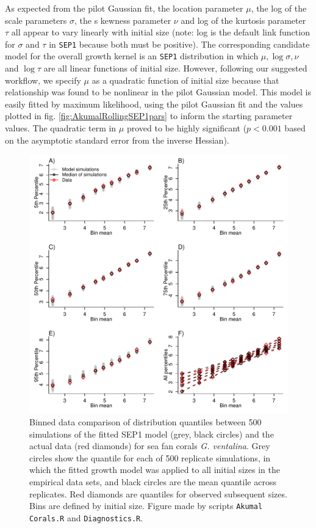 \documentclass[11pt]{article}
\begin{document}
{As expected from the pilot Gaussian fit, the location parameter $\mu$, the log of the scale parameters $\sigma$, the s
kewness parameter $\nu$ and log of the kurtosis parameter $\tau$ all appear to vary linearly with initial size 
(note: log is the default link function for $\sigma$ and $\tau$ in \texttt{SEP1} because both must be positive).
The corresponding candidate model for the overall growth kernel is an \texttt{SEP1} distribution in 
which $\mu, \log \sigma, \nu$ and $\log \tau$ are all linear functions of initial size.
However, following our suggested workflow, we specify $\mu$ as a quadratic function of initial size because that relationship
was found to be nonlinear in the pilot Gaussian model. This model is easily fitted by maximum likelihood, 
using the pilot Gaussian fit and the values plotted in fig. \ref{fig:AkumalRollingSEP1pars} to 
inform the starting parameter values. The quadratic term in $\mu$ proved to be highly significant
($p<0.001$ based on the asymptotic standard error from the inverse Hessian). 

\begin{figure}[tbp]
\centering
\includegraphics[width=.95\textwidth]{figures/CoralQuantileComparePlot.pdf}
\caption{Binned data comparison of distribution quantiles between 500 simulations of the fitted SEP1 model (grey, black circles) and the 
actual data (red diamonds) for sea fan corals \emph{G. ventalina}. Grey circles show the quantile for each of 500 replicate simulations,
in which the fitted growth model was applied to all initial sizes in the empirical data sets, and black circles are the mean
quantile across replicates. Red diamonds are quantiles for observed subsequent sizes. Bins are defined by initial size. Figure
made by scripts \texttt{Akumal Corals.R} and \texttt{Diagnostics.R}.}
\label{fig:CoralQuantileCompare}
\end{figure} 


}
\end{document}

